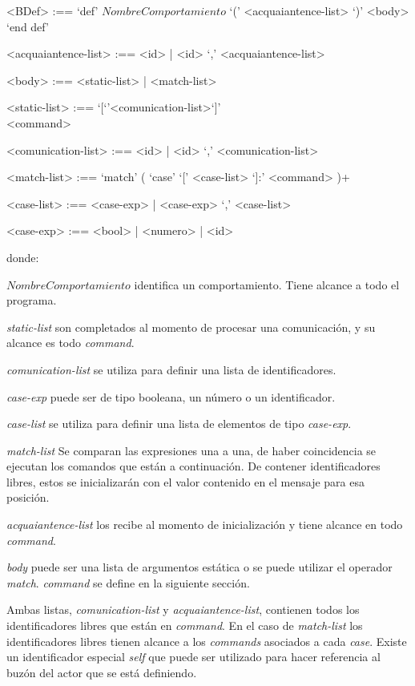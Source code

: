 \begin{grammar}
<BDef> :== `def' $NombreComportamiento$ `(' <acquaiantence-list> `)' <body> `end def'

<acquaiantence-list> :== <id> | <id> `,' <acquaiantence-list> 

<body> :== <static-list> | <match-list>

<static-list> :== `[`'<comunication-list>`]' \\ <command>

<comunication-list> :== <id> | <id> `,' <comunication-list>

<match-list> :==  `match' ( `case' `[' <case-list> `]:' <command> )+  

<case-list> :== <case-exp> | <case-exp> `,' <case-list> 

<case-exp> :== <bool> | <numero> | <id>  
\end{grammar}
donde: 
\begin{description}
 \item $NombreComportamiento$ identifica un comportamiento. Tiene alcance a todo el programa. 
 \item \textit{static-list} son completados al momento de procesar una comunicación, y su alcance es todo \textit{command}. 
 \item \textit{comunication-list} se utiliza para definir una lista de identificadores.
 \item \textit{case-exp} puede ser de tipo booleana, un número o un identificador. 
 \item \textit{case-list} se utiliza para definir una lista de elementos de tipo \textit{case-exp}.
 \item \textit{match-list} Se comparan las expresiones una a una, de haber coincidencia se ejecutan los comandos que están a continuación. De contener identificadores libres, estos se inicializarán con el valor contenido en el mensaje para esa posición.
 \item \textit{acquaiantence-list} los recibe al momento de inicialización y tiene alcance en todo \textit{command}.
 \item \textit{body} puede ser una lista de argumentos estática o se puede utilizar el operador \textit{match}. \textit{command} se define en la siguiente sección.
\end{description}

Ambas listas, \textit{comunication-list} y \textit{acquaiantence-list}, contienen todos los identificadores libres que están en \textit{command}. En el caso de \textit{match-list} los identificadores libres tienen alcance a los \textit{commands} asociados a cada \textit{case}. Existe un identificador especial \textit{self} que puede ser utilizado para hacer referencia al buzón del actor que se está definiendo. 

